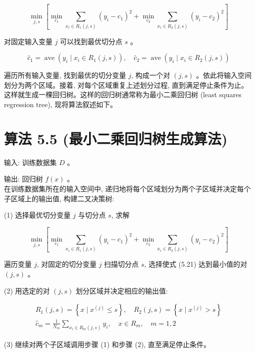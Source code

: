 \documentclass[10pt]{article}
\begin{document}
\begin{CJK*}{UTF8}{bsmi}
\begin{equation*}
\min _{j, s}\left[\min _{c_{1}} \sum_{x_{i} \in R_{1}(j, s)}\left(y_{i}-c_{1}\right)^{2}+\min _{c_{2}} \sum_{x_{i} \in R_{2}(j, s)}\left(y_{i}-c_{2}\right)^{2}\right] \tag{5.19}
\end{equation*}


对固定输入变量 $j$ 可以找到最优切分点 $s$ 。


\begin{equation*}
\hat{c}_{1}=\operatorname{ave}\left(y_{i} \mid x_{i} \in R_{1}(j, s)\right), \quad \hat{c}_{2}=\operatorname{ave}\left(y_{i} \mid x_{i} \in R_{2}(j, s)\right) \tag{5.20}
\end{equation*}


遍历所有输入变量, 找到最优的切分变量 $j$, 构成一个对 $(j, s)$ 。依此将输入空间划分为两个区域。接着, 对每个区域重复上述划分过程, 直到满足停止条件为止。这样就生成一棵回归树。这样的回归树通常称为最小二乘回归树 (least squares regression tree), 现将算法叙述如下。

\section*{算法 5.5 (最小二乘回归树生成算法)}
输入: 训练数据集 $D$ 。

输出: 回归树 $f(x)$ 。\\
在训练数据集所在的输入空间中, 递归地将每个区域划分为两个子区域并决定每个子区域上的输出值, 构建二叉决策树:

(1) 选择最优切分变量 $j$ 与切分点 $s$, 求解


\begin{equation*}
\min _{j, s}\left[\min _{c_{1}} \sum_{x_{i} \in R_{1}(j, s)}\left(y_{i}-c_{1}\right)^{2}+\min _{c_{2}} \sum_{x_{i} \in R_{2}(j, s)}\left(y_{i}-c_{2}\right)^{2}\right] \tag{5.21}
\end{equation*}


遍历变量 $j$, 对固定的切分变量 $j$ 扫描切分点 $s$, 选择使式 (5.21) 达到最小值的对 $(j, s)$ 。

(2) 用选定的对 $(j, s)$ 划分区域并决定相应的输出值:

$$
\begin{gathered}
R_{1}(j, s)=\left\{x \mid x^{(j)} \leqslant s\right\}, \quad R_{2}(j, s)=\left\{x \mid x^{(j)}>s\right\} \\
\hat{c}_{m}=\frac{1}{N_{m}} \sum_{x_{i} \in R_{m}(j, s)} y_{i}, \quad x \in R_{m}, \quad m=1,2
\end{gathered}
$$

(3) 继续对两个子区域调用步骤 (1) 和步骤 (2), 直至满足停止条件。


\end{CJK*}
\end{document}
